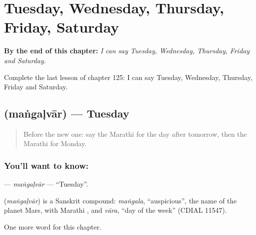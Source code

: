 
\chapter{Tuesday, Wednesday, Thursday, Friday, Saturday}
\label{ch:mr-tuesday-wednesday-thursday-friday-saturday}

\begin{chapteropening}
\textbf{By the end of this chapter:} \emph{I can say Tuesday, Wednesday, Thursday, Friday and Saturday.}

Complete the last lesson of chapter 125: I can say Tuesday, Wednesday, Thursday, Friday and Saturday.
\end{chapteropening}

\section[\texorpdfstring{\mr{मंगळवार} (maṅgaḷvār)}{मंगळवार (maṅgaḷvār)}]{ (maṅgaḷvār) — Tuesday}

\label{lesson:MR-C125-mangalvar}



\begin{quote}
Before the new one: say the Marathi for the day after tomorrow, then the Marathi for Monday.
\end{quote}

\subsection*{You'll want to know: }
\textbf{} — \emph{maṅgaḷvār} — \textquotedblleft{}Tuesday\textquotedblright{}.

\begin{cousinweb}
\textbf{} (\emph{maṅgaḷvār}) is a Sanskrit compound: \emph{maṅgala}, \textquotedblleft{}auspicious\textquotedblright{}, the name of the planet Mars, with Marathi \textbf{}, and \emph{vāra}, \textquotedblleft{}day of the week\textquotedblright{} (CDIAL 11547).
\end{cousinweb}

\begin{grammarlens}[title={What you've built}]
One more word for this chapter.
\end{grammarlens}

